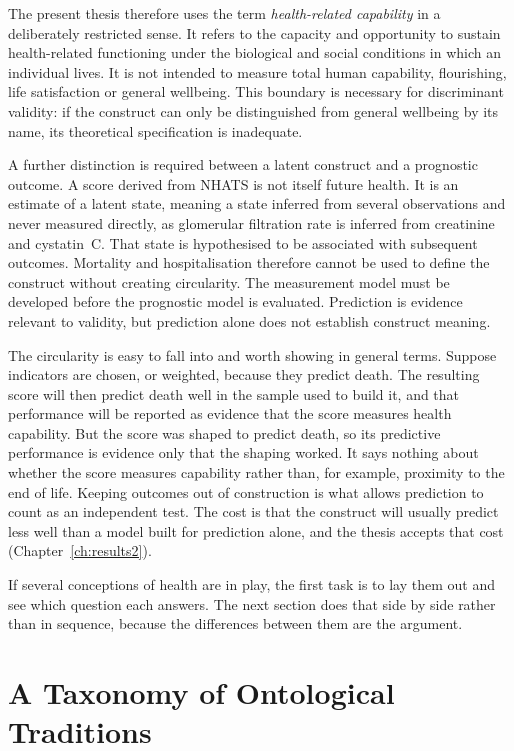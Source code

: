 The present thesis therefore uses the term \emph{health-related capability} in a deliberately restricted sense. It refers to the capacity and opportunity to sustain health-related functioning under the biological and social conditions in which an individual lives. It is not intended to measure total human capability, flourishing, life satisfaction or general wellbeing. This boundary is necessary for discriminant validity: if the construct can only be distinguished from general wellbeing by its name, its theoretical specification is inadequate.

A further distinction is required between a latent construct and a prognostic outcome. A score derived from NHATS is not itself future health. It is an estimate of a latent state, meaning a state inferred from several observations and never measured directly, as glomerular filtration rate is inferred from creatinine and cystatin~C. That state is hypothesised to be associated with subsequent outcomes. Mortality and hospitalisation therefore cannot be used to define the construct without creating circularity. The measurement model must be developed before the prognostic model is evaluated. Prediction is evidence relevant to validity, but prediction alone does not establish construct meaning.

The circularity is easy to fall into and worth showing in general terms. Suppose indicators are chosen, or weighted, because they predict death. The resulting score will then predict death well in the sample used to build it, and that performance will be reported as evidence that the score measures health capability. But the score was shaped to predict death, so its predictive performance is evidence only that the shaping worked. It says nothing about whether the score measures capability rather than, for example, proximity to the end of life. Keeping outcomes out of construction is what allows prediction to count as an independent test. The cost is that the construct will usually predict less well than a model built for prediction alone, and the thesis accepts that cost (Chapter~\ref{ch:results2}).

If several conceptions of health are in play, the first task is to lay them out and see which question each answers. The next section does that side by side rather than in sequence, because the differences between them are the argument.

\section{A Taxonomy of Ontological Traditions}
\label{sec:lit-taxonomy}

